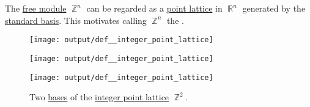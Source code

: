 \begin{definition}\label{def:integer_point_lattice}\mimprovised
  The \hyperref[def:free_semimodule]{free module} \( \BbbZ^n \) can be regarded as a \hyperref[def:point_lattice]{point lattice} in \( \BbbR^n \) generated by the \hyperref[def:coordinate_space]{standard basis}. This motivates calling \( \BbbZ^n \) the .

  \begin{figure}[!ht]
    \begin{subcaptionblock}{0.3\textwidth}
      \centering
      \texttt{[image: output/def\_\_integer\_point\_lattice]}
    \end{subcaptionblock}
    \hfill
    \begin{subcaptionblock}{0.3\textwidth}
      \centering
      \texttt{[image: output/def\_\_integer\_point\_lattice]}
    \end{subcaptionblock}
    \hfill
    \begin{subcaptionblock}{0.3\textwidth}
      \centering
      \texttt{[image: output/def\_\_integer\_point\_lattice]}
    \end{subcaptionblock}
    \caption{Two \hyperref[def:point_lattice_basis]{bases} of the \hyperref[def:integer_point_lattice]{integer point lattice} \( \BbbZ^2 \).}\label{fig:def:integer_point_lattice}
  \end{figure}
\end{definition}
